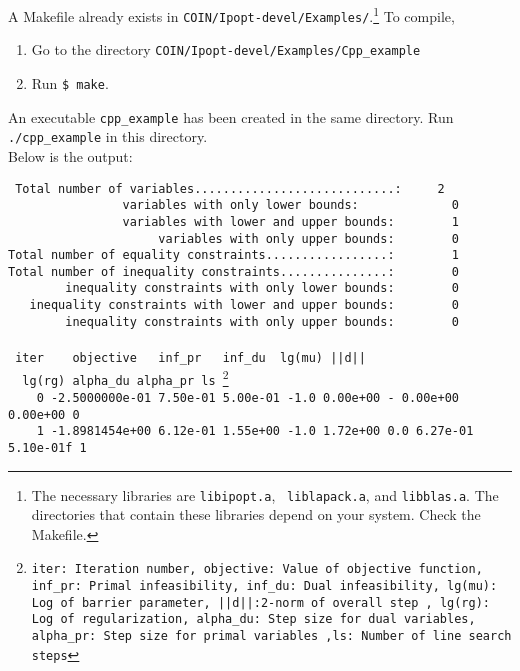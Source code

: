 \documentclass[letter,12pt]{article}
\begin{document}
A Makefile already exists in {\tt COIN/Ipopt-devel/Examples/}.\footnote{The
necessary libraries are {\tt libipopt.a}, {\tt
liblapack.a}, and {\tt libblas.a}. The directories that contain these libraries
 depend on your system. Check the Makefile.}
To compile,
\begin{enumerate}
\item{Go to the directory {\tt COIN/Ipopt-devel/Examples/Cpp\_example}}
\item{Run {\tt \$ make}.}
\end{enumerate}
%
An executable {\tt cpp\_example} has been created in the same
directory. Run {\tt ./cpp\_example} in this directory.\\
Below is the output:\\

\begin{small}
{\tt
Total number of variables............................:~~~~~2\\
~~~~~~~~~~~~~~~~variables with only lower bounds:~~~~~~~~~~~~~0\\
~~~~~~~~~~~~~~~~variables with lower and upper bounds:~~~~~~~~1\\
~~~~~~~~~~~~~~~~~~~~~variables with only upper bounds:~~~~~~~~0\\
Total number of equality constraints.................:~~~~~~~~1\\
Total number of inequality constraints...............:~~~~~~~~0\\
~~~~~~~~inequality constraints with only lower bounds:~~~~~~~~0\\
~~~inequality constraints with lower and upper bounds:~~~~~~~~0\\
~~~~~~~~inequality constraints with only upper bounds:~~~~~~~~0\\
\\
~iter~~~~objective~~~inf\_pr~~~inf\_du~~lg(mu)~||d||~~lg(rg)~alpha\_du~alpha\_pr~ls
\footnote{{\tt iter}: Iteration number, {\tt objective}: Value of objective
 function, {\tt inf\_pr}: Primal infeasibility, {\tt inf\_du}: Dual infeasibility,
 {\tt lg(mu)}: Log of barrier parameter, {\tt ||d||}:2-norm of overall
 step , {\tt lg(rg)}: Log of regularization,
 {\tt alpha\_du}: Step size for dual variables,  {\tt alpha\_pr}: Step
 size for primal variables ,{\tt ls}: Number of line search steps}\\
~~~~0  -2.5000000e-01 7.50e-01 5.00e-01  -1.0 0.00e+00    -  0.00e+00 0.00e+00  0\\
~~~~1  -1.8981454e+00 6.12e-01 1.55e+00  -1.0 1.72e+00   0.0 6.27e-01 5.10e-01f  1\\
}
\end{small}
\end{document}
